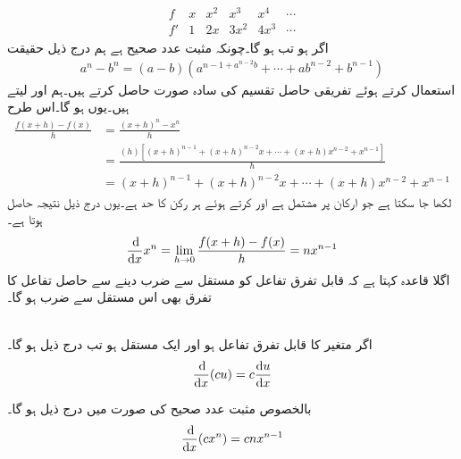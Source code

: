 \begin{align*}
\begin{array}{c|c|c|c|c|c}
f&x&x^2&x^3&x^4&\cdots\\
\hline
f'&1&2x&3x^2&4x^3&\cdots
\end{array}
\end{align*}
اگر  ہو تب  ہو گا۔چونکہ  مثبت عدد صحیح ہے ہم درج ذیل حقیقت 
\begin{align*}
a^n-b^n=(a-b)(a^{n-1+a^{n-2}b}+\cdots+ab^{n-2}+b^{n-1})
\end{align*}
استعمال کرتے ہوئے تفریقی حاصل تقسیم کی سادہ صورت حاصل کرتے ہیں۔ہم  اور  لیتے ہیں۔یوں  ہو گا۔اس طرح 
\begin{align*}
\frac{f(x+h)-f(x)}{h}&=\frac{(x+h)^n-x^n}{h}\\
&=\frac{(h)[(x+h)^{n-1}+(x+h)^{n-2}x+\cdots+(x+h)x^{n-2}+x^{n-1}]}{h}\\
&=(x+h)^{n-1}+(x+h)^{n-2}x+\cdots+(x+h)x^{n-2}+x^{n-1}
\end{align*}
لکھا جا سکتا ہے جو  ارکان پر مشتمل ہے اور   کرتے ہوئے ہر رکن کا  حد  ہے۔یوں درج ذیل  نتیجہ حاصل ہوتا ہے۔ 
\begin{align*}
\frac{\dif}{\dif x}x^n=\lim_{h\to 0}\frac{f(x+h)-f(x)}{h}=nx^{n-1}
\end{align*}
اگلا قاعدہ کہتا ہے کہ قابل تفرق تفاعل کو مستقل سے ضرب دینے سے حاصل تفاعل کا تفرق بھی اس مستقل سے ضرب ہو گا۔

\\
اگر  متغیر  کا قابل تفرق تفاعل ہو اور  ایک مستقل ہو تب درج ذیل ہو گا۔
\begin{align*}
\frac{\dif}{\dif x} (cu)=c\frac{\dif u}{\dif x}
\end{align*}

بالخصوص مثبت عدد صحیح  کی صورت میں درج ذیل ہو گا۔
\begin{align*}
\frac{\dif}{\dif x} (cx^n)=cnx^{n-1}
\end{align*}

